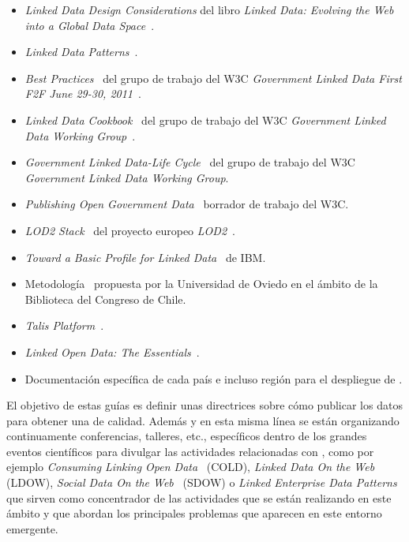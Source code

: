 \begin{itemize}
 \item \textit{Linked Data Design Considerations} del libro \textit{Linked Data: Evolving the Web into a Global Data Space}~\cite{Heath_Bizer_2011}.
 \item \textit{Linked Data Patterns}~\cite{linked-data-patterns}.
 \item \textit{Best Practices}~\cite{best-gld,Berr08} del grupo de trabajo del \gls{W3C} \textit{Government Linked Data First \gls{F2F} June 29-30, 2011}~\cite{gld-group}.
 \item \textit{Linked Data Cookbook}~\cite{linked-data-cookbook} del grupo de trabajo del W3C \textit{Government Linked Data Working Group}~\cite{gld-group}.
 \item \textit{Government Linked Data-Life Cycle}~\cite{gld-lifecycle} del grupo de trabajo del W3C \textit{Government Linked Data Working Group}.
 \item \textit{Publishing Open Government Data}~\cite{publishing-ogd} borrador de trabajo del W3C.
 \item \textit{LOD2 Stack}~\cite{lod2-stack} del proyecto europeo \textit{LOD2}~\cite{lod2-project}.
 \item \textit{Toward a Basic Profile for Linked Data}~\cite{basic-profile-w3c,basic-profile-ibm} de IBM.
 \item Metodología~\cite{DBLP:conf/i-semantics/Cifuentes-SilvaSG11,methodologyCaepia2011} propuesta por la Universidad de Oviedo en el ámbito de la Biblioteca del Congreso de Chile.
 \item \textit{Talis Platform}~\cite{talis}.  
 \item \textit{Linked Open Data: The Essentials}~\cite{Bauer2012}.
\item Documentación específica de cada país e incluso región para el despliegue de \opendata.
\end{itemize}

El objetivo de estas guías es definir unas directrices sobre cómo publicar los datos para obtener una \wod de calidad. Además y en 
esta misma línea se están organizando continuamente conferencias, talleres, etc., específicos dentro de los grandes eventos científicos
para divulgar las actividades relacionadas con \linkeddata, como por ejemplo \textit{Consuming Linking Open Data}~\cite{cold} (\gls{COLD}), 
\textit{Linked Data On the Web}~\cite{ldow} (\gls{LDOW}), \textit{Social Data On the Web}~\cite{sdow} (\gls{SDOW}) o \textit{Linked Enterprise Data Patterns}~\cite{linked-enterprise-data-patterns} que sirven 
como concentrador de las actividades que se están realizando en este ámbito y que abordan los principales problemas 
que aparecen en este entorno emergente.

